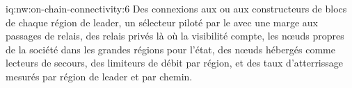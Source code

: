 \begin{solution}{iq:nw:on-chain-connectivity:6}
Des connexions aux  ou aux constructeurs de blocs de chaque région de leader, un sélecteur piloté par le  avec une marge aux passages de relais, des relais privés
là où la visibilité compte, les nœuds propres de la société dans les grandes régions pour l'état, des nœuds hébergés comme lecteurs de secours, des limiteurs de débit par région, et des taux d'atterrissage
mesurés par région de leader et par chemin.
\end{solution}
